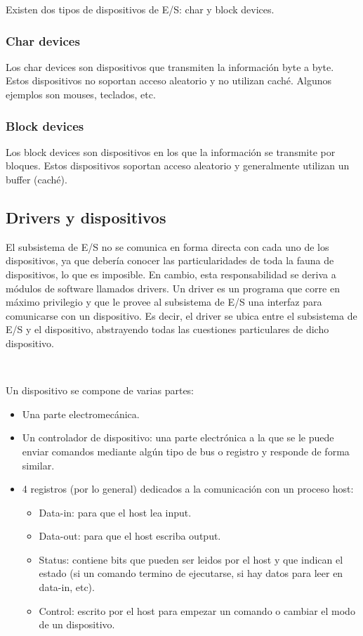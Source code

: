 \documentclass{article}
\begin{document}
Existen dos tipos de dispositivos de E/S: char y block devices.

\subsubsection{Char devices}

Los char devices son dispositivos que transmiten la informaci\'on byte a byte. Estos dispositivos no soportan acceso aleatorio y no utilizan cach\'e. Algunos ejemplos son mouses, teclados, etc.

\subsubsection{Block devices}

Los block devices son dispositivos en los que la informaci\'on se transmite por bloques. Estos dispositivos soportan acceso aleatorio y generalmente utilizan un buffer (cach\'e).

\subsection{Drivers y dispositivos}

El subsistema de E/S no se comunica en forma directa con cada uno de los dispositivos, ya que debería conocer las particularidades de toda la fauna de dispositivos, lo que es imposible. En cambio, esta responsabilidad se deriva a módulos de software llamados drivers. Un driver es un programa que corre en máximo privilegio y que le provee al subsistema de E/S una interfaz para comunicarse con un dispositivo. Es decir, el driver se ubica entre el subsistema de E/S y el dispositivo, abstrayendo todas las cuestiones particulares de dicho dispositivo.

~

Un dispositivo se compone de varias partes:

\begin{itemize}
 \item Una parte electromecánica.
 \item Un controlador de dispositivo: una parte electrónica a la que se le puede enviar comandos mediante algún tipo de bus o registro y responde de forma similar.
 \item 4 registros (por lo general) dedicados a la comunicación con un proceso host:
 \begin{itemize}
  \item Data-in: para que el host lea input.
  \item Data-out: para que el host escriba output.
  \item Status: contiene bits que pueden ser leidos por el host y que indican el estado (si un comando termino de ejecutarse, si hay datos para leer en data-in, etc).
  \item Control: escrito por el host para empezar un comando o cambiar el modo de un dispositivo.
 \end{itemize}

\end{itemize}
\end{document}
